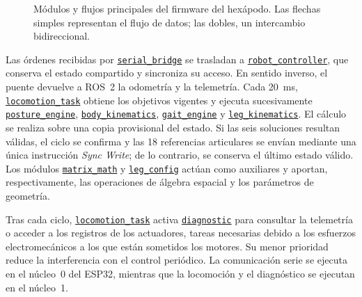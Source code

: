 \begin{figure}[H]
{}
    \captionsetup{justification=centering}
    \caption[Organización del firmware del hexápodo]
    {Módulos y flujos principales del firmware del hexápodo. Las flechas simples
    representan el flujo de datos; las dobles, un intercambio bidireccional.}
    \label{fig:organizacion_firmware}
\end{figure}
\vspace{-1\baselineskip}

Las órdenes recibidas por
\hyperref[subsec:serial_bridge]{\texttt{serial\_bridge}} se trasladan a
\hyperref[subsec:robot_controller]{\texttt{robot\_controller}}, que conserva el
estado compartido y sincroniza su acceso. En sentido inverso, el puente devuelve
a ROS~2 la odometría y la telemetría. Cada 20~ms,
\hyperref[subsec:locomotion_task]{\texttt{locomotion\_task}} obtiene los
objetivos vigentes y ejecuta sucesivamente
\hyperref[subsec:posture_engine]{\texttt{posture\_engine}},
\hyperref[subsec:body_kinematics]{\texttt{body\_kinematics}},
\hyperref[subsec:gait_engine]{\texttt{gait\_engine}} y
\hyperref[subsec:leg_kinematics]{\texttt{leg\_kinematics}}. El cálculo se realiza
sobre una copia provisional del estado. Si las seis soluciones resultan válidas,
el ciclo se confirma y las 18 referencias articulares se envían mediante una
única instrucción \textit{Sync Write}; de lo contrario, se conserva el último
estado válido. Los módulos
\hyperref[subsec:matrix_math]{\texttt{matrix\_math}} y
\hyperref[subsec:leg_config]{\texttt{leg\_config}} actúan como auxiliares y
aportan, respectivamente, las operaciones de álgebra espacial y los parámetros
de geometría.

Tras cada ciclo, \hyperref[subsec:locomotion_task]{\texttt{locomotion\_task}}
activa \hyperref[subsec:diagnostic]{\texttt{diagnostic}} para consultar la
telemetría o acceder a los registros de los actuadores, tareas necesarias debido a los esfuerzos electromecánicos a los que están sometidos los motores. Su menor prioridad reduce
la interferencia con el control periódico. La comunicación serie se ejecuta en el
núcleo~0 del ESP32, mientras que la locomoción y el diagnóstico se ejecutan en el
núcleo~1.


